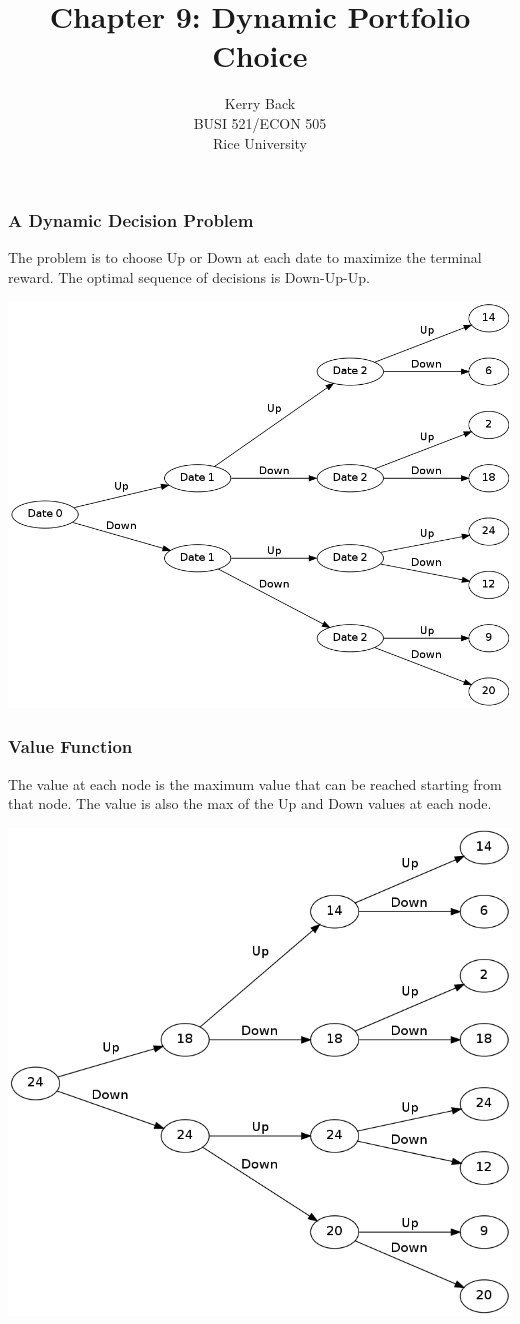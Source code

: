 \documentclass[10pt]{beamer}
\title{Chapter 9: Dynamic Portfolio Choice}
\date{}
\author{Kerry Back\\ 
BUSI 521/ECON 505\\
Rice University}
\newcommand{\bfr}{\begin{frame}}
\begin{document}
\maketitle

\bfr\frametitle{A Dynamic Decision Problem}
The problem is to choose Up or Down at each date to maximize the terminal reward.  The optimal sequence of decisions is Down-Up-Up.
\begin{center}
\includegraphics[scale=.2]{images/fig9_1.png}
\end{center}

\end{frame}

\bfr\frametitle{Value Function}
The value at each node is the maximum value that can be reached starting from that node.  The value is also the max of the Up and Down values at each node.
\begin{center}
\includegraphics[scale=.2]{images/fig9_2.png}
\end{center}
\end{frame}
\end{document}
